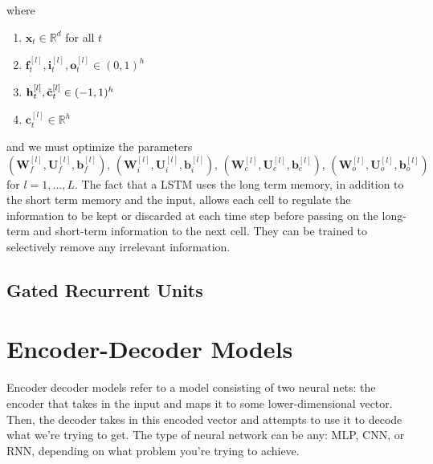 \documentclass{article}
\theoremstyle{definition}
\theoremstyle{remark}
\theoremstyle{definition}
\begin{document}
where 
\begin{enumerate}
    \item $\mathbf{x}_t \in \mathbb{R}^d$ for all $t$ 
    \item $\mathbf{f}_t^{[l]}, \mathbf{i}_t^{[l]}, \mathbf{o}_t^{[l]} \in (0, 1)^h$
    \item $\mathbf{h}_t^{[l]}, \Tilde{\mathbf{c}}_t^{[l]} \in (-1, 1)^h$
    \item $\mathbf{c}_t^{[l]} \in \mathbb{R}^h$
\end{enumerate}
and we must optimize the parameters 
\[(\mathbf{W}_f^{[l]}, \mathbf{U}_f^{[l]}, \mathbf{b}_f^{[l]}), \, (\mathbf{W}_i^{[l]}, \mathbf{U}_i^{[l]}, \mathbf{b}_i^{[l]}), \, (\mathbf{W}_c^{[l]}, \mathbf{U}_c^{[l]}, \mathbf{b}_c^{[l]}), \, (\mathbf{W}_o^{[l]}, \mathbf{U}_o^{[l]}, \mathbf{b}_o^{[l]})\]
for $l = 1, \ldots, L$. The fact that a LSTM uses the long term memory, in addition to the short term memory and the input, allows each cell to regulate the information to be kept or discarded at each time step before passing on the long-term and short-term information to the next cell. They can be trained to selectively remove any irrelevant information. 


\subsection{Gated Recurrent Units}


\section{Encoder-Decoder Models}

Encoder decoder models refer to a model consisting of two neural nets: the encoder that takes in the input and maps it to some lower-dimensional vector. Then, the decoder takes in this encoded vector and attempts to use it to decode what we're trying to get. The type of neural network can be any: MLP, CNN, or RNN, depending on what problem you're trying to achieve. 
\end{document}
